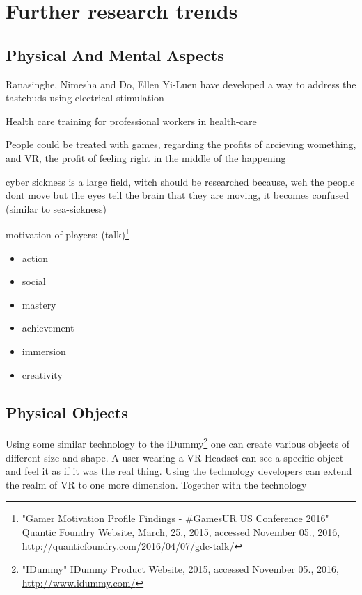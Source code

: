 \section{Further research trends}
\subsection{Physical And Mental Aspects}

Ranasinghe, Nimesha and Do, Ellen Yi-Luen have developed a way to address the tastebuds using electrical stimulation \cite{Ranasinghe:2016:VSS:2984751.2985729}

Health care training for professional workers in health-care

People could be treated with games, regarding the profits of arcieving womething, and VR, the profit of feeling right in the middle of the happening

cyber sickness is a large field, witch should be researched because, weh the people dont move but the eyes tell the brain that they are moving, it becomes confused (similar to sea-sickness)

motivation of players: (talk)\footnote{"Gamer Motivation Profile Findings - \#GamesUR US Conference 2016" Quantic Foundry Website, March, 25., 2015, accessed November 05., 2016, \url{http://quanticfoundry.com/2016/04/07/gdc-talk/}}
\begin{itemize}
	\item action
	\item social
	\item mastery
	\item achievement
	\item immersion
	\item creativity
\end{itemize}


\subsection{Physical Objects}

Using some similar technology to the iDummy\footnote{"IDummy" IDummy Product Website, 2015, accessed November 05., 2016, \url{http://www.idummy.com/}} one can create various objects of different size and shape. A user wearing a VR Headset can see a specific object and feel it as if it was the real thing. Using the technology developers can extend the realm of VR to one more dimension. Together with the technology~\cite{Azmandian:2016:HRD:2858036.2858226}


